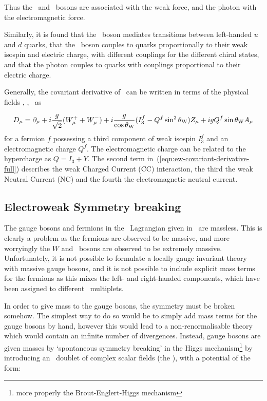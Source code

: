 Thus the \W\ and \Z\ bosons are associated with the weak force, and the photon
with the electromagnetic force. 

Similarly, it is found that the \W\ boson mediates
transitions between left-handed $u$ and $d$ quarks, that the
\Z\ boson couples to quarks proportionally to their weak isospin and electric
charge, with different couplings for the different chiral states, and that the photon couples to
quarks with couplings proportional to their electric charge.

Generally, the covariant derivative of~ can be
written in terms of the physical fields \Wpmmu, \Zmu, \Amu\ as

\begin{equation}
D_{\mu}  =  \partial_{\mu} + i \frac{g}{\sqrt{2}} ( W^{+}_{\mu} + W^{-}_{\mu} ) 
+ i \frac{g}{\cos{\ensuremath{\theta_{\mathrm{W}}}}} ( I^{f}_{3} - Q^{f} \sin^{2}{\theta_{\mathrm{W}}} ) Z_{\mu}
+ i g Q^{f} \sin{\ensuremath{\theta_{\mathrm{W}}}} A_{\mu}
\label{eqn:ew-covariant-derivative-full}
\end{equation}
for a fermion $f$ possessing a third component of weak isospin $I_{3}^{f}$
and an electromagnetic charge $Q^{f}$. The electromagnetic charge can be related
to the hypercharge as $Q = I_{3} + Y$. The second term
in~(\ref{eqn:ew-covariant-derivative-full}) describes the weak Charged Current (CC)
interaction, the third the weak Neutral Current (NC) and the fourth the
electromagnetic neutral current.

\subsection{Electroweak Symmetry breaking}

The gauge bosons and fermions in the \ew\ Lagrangian given
in~ are massless. This is clearly a problem as the fermions
are observed to be massive, and more worryingly the $W$ and \Z\ bosons are
observed to be extremely massive. Unfortunately, it is not possible to formulate a locally gauge invariant theory with massive
gauge bosons, and it is not possible to include explicit mass terms for the
fermions as this mixes the left- and right-handed components, which have been
assigned to different \sutwo\ multiplets. 

In order to give
mass to the gauge bosons, the symmetry must be broken somehow. The simplest way
to do so would be to simply add mass terms for the gauge bosons by hand, however
this would lead to a non-renormalisable theory which would contain an infinite
number of divergences. Instead, gauge bosons are given masses by `spontaneous
symmetry breaking' in the Higgs mechanism\footnote{more properly the Brout-Englert-Higgs
mechanism} by introducing an \sutwo\ doublet of complex scalar fields (the ), with a potential of the form:

